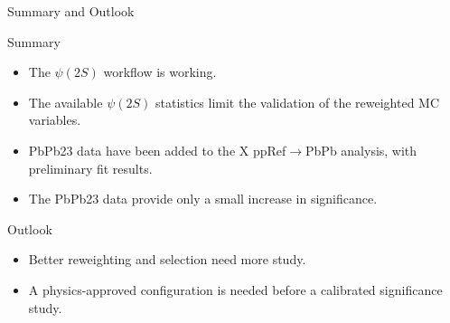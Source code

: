 \documentclass[11pt,aspectratio=169]{beamer}
\begin{document}
\begin{frame}[label=p12]{Summary and Outlook}
  \small
  \begin{block}{Summary}
    \begin{itemize}
      \setlength{\itemsep}{0.35em}
      \item The $\psi(2S)$ workflow is working.
      \item The available $\psi(2S)$ statistics limit the validation of the reweighted MC variables.
      \item PbPb23 data have been added to the X ppRef$\rightarrow$PbPb analysis, with preliminary fit results.
      \item The PbPb23 data provide only a small increase in significance.
    \end{itemize}
  \end{block}

  \vspace{0.35em}
  \begin{exampleblock}{Outlook}
    \begin{itemize}
      \setlength{\itemsep}{0.30em}
      \item Better reweighting and selection need more study.
      \item A physics-approved configuration is needed before a calibrated significance study.
    \end{itemize}
  \end{exampleblock}
\end{frame}

\begin{frame}[plain,label=p13]{\strut}
  \centering
  \vfill
  \vfill
\end{frame}
\end{document}
